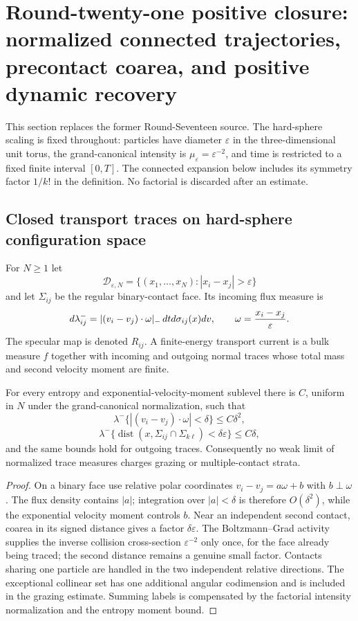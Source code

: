 \section{Round-twenty-one positive closure: normalized connected trajectories, precontact coarea, and positive dynamic recovery}
\label{sec:r21-b2}

This section replaces the former Round-Seventeen source.  The hard-sphere
scaling is fixed throughout: particles have diameter $\varepsilon$ in the
three-dimensional unit torus, the grand-canonical intensity is
$\mu_\varepsilon=\varepsilon^{-2}$, and time is restricted to a fixed finite
interval $[0,T]$.  The connected expansion below includes its symmetry factor
$1/k!$ in the definition.  No factorial is discarded after an estimate.

\subsection{Closed transport traces on hard-sphere configuration space}

For $N\ge1$ let
\[
 \mathcal D_{\varepsilon,N}=
 \{(x_1,\ldots,x_N):|x_i-x_j|>\varepsilon\}
\]
and let $\Sigma_{ij}$ be the regular binary-contact face.  Its incoming flux
measure is
\[
 d\lambda_{ij}^{-}=
 |(v_i-v_j)\cdot\omega|_-
 \,dtd\sigma_{ij}(x)dv,
 \qquad \omega={x_i-x_j\over\varepsilon}.
\]
The specular map is denoted $R_{ij}$.  A finite-energy transport current is a
bulk measure $f$ together with incoming and outgoing normal traces whose total
mass and second velocity moment are finite.

\begin{lemma}
\label{lem:r21-b2-singular}
For every entropy and exponential-velocity-moment sublevel there is $C$,
uniform in $N$ under the grand-canonical normalization, such that
\[
 \lambda^-\{|(v_i-v_j)\cdot\omega|<\delta\}
 \le C\delta^2,
\]
\[
 \lambda^-\{\operatorname{dist}(x,\Sigma_{ij}\cap\Sigma_{k\ell})<\delta
 \varepsilon\}\le C\delta,
\]
and the same bounds hold for outgoing traces.  Consequently no weak limit of
normalized trace measures charges grazing or multiple-contact strata.
\end{lemma}

\begin{proof}
On a binary face use relative polar coordinates
$v_i-v_j=a\omega+b$ with $b\perp\omega$.  The flux density contains $|a|$;
integration over $|a|<\delta$ is therefore $O(\delta^2)$, while the
exponential velocity moment controls $b$.  Near an independent second contact,
coarea in its signed distance gives a factor $\delta\varepsilon$.  The
Boltzmann--Grad activity supplies the inverse collision cross-section
$\varepsilon^{-2}$ only once, for the face already being traced; the second
distance remains a genuine small factor.  Contacts sharing one particle are
handled in the two independent relative directions.  The exceptional
collinear set has one additional angular codimension and is included in the
grazing estimate.  Summing labels is compensated by the factorial intensity
normalization and the entropy moment bound.
\end{proof}

